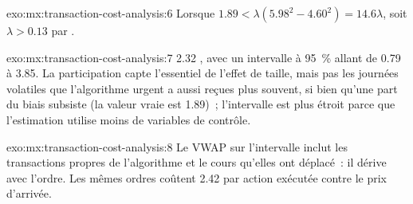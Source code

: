 \begin{solution}{exo:mx:transaction-cost-analysis:6}
Lorsque $1.89<\lambda(5.98^2-4.60^2)=14.6\lambda$, soit $\lambda>0.13$ par .
\end{solution}

\begin{solution}{exo:mx:transaction-cost-analysis:7}
2.32 , avec un intervalle à 95~\% allant de 0.79 à 3.85. La participation capte l'essentiel de l'effet de taille, mais pas les journées volatiles que l'algorithme
urgent a aussi reçues plus souvent, si bien qu'une part du biais subsiste (la valeur vraie est 1.89)~; l'intervalle est plus étroit parce que l'estimation utilise moins de
variables de contrôle.
\end{solution}

\begin{solution}{exo:mx:transaction-cost-analysis:8}
Le VWAP sur l'intervalle inclut les transactions propres de l'algorithme et le cours qu'elles ont déplacé~: il dérive avec l'ordre. Les mêmes ordres coûtent 2.42  par action exécutée
contre le prix d'arrivée.
\end{solution}

